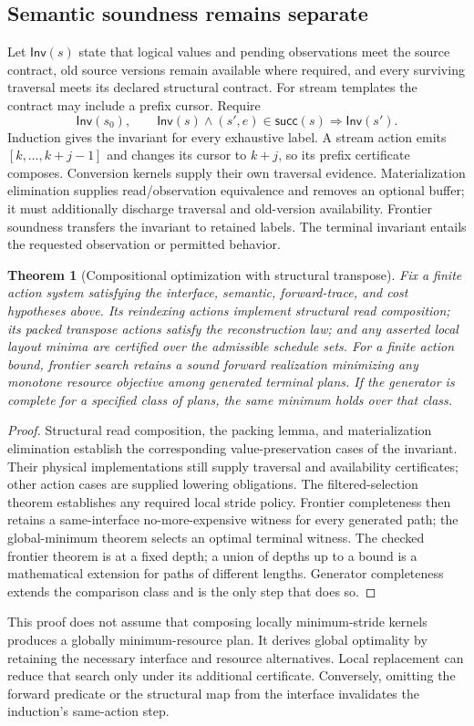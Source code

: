 \documentclass[11pt]{article}
\newtheorem{theorem}{Theorem}
\begin{document}
\subsection{Semantic soundness remains separate}
Let $\mathsf{Inv}(s)$ state that logical values and pending observations meet the source contract, old source versions remain available where required, and every surviving traversal meets its declared structural contract. For stream templates the contract may include a prefix cursor. Require
\[
 \mathsf{Inv}(s_0),\qquad
 \mathsf{Inv}(s)\land(s',e)\in\mathsf{succ}(s)
 \Longrightarrow\mathsf{Inv}(s').
\]
Induction gives the invariant for every exhaustive label. A stream action emits $[k,\ldots,k+j-1]$ and changes its cursor to $k+j$, so its prefix certificate composes. Conversion kernels supply their own traversal evidence. Materialization elimination supplies read/observation equivalence and removes an optional buffer; it must additionally discharge traversal and old-version availability. Frontier soundness transfers the invariant to retained labels. The terminal invariant entails the requested observation or permitted behavior.

\begin{theorem}[Compositional optimization with structural transpose]
Fix a finite action system satisfying the interface, semantic, forward-trace, and cost hypotheses above. Its reindexing actions implement structural read composition; its packed transpose actions satisfy the reconstruction law; and any asserted local layout minima are certified over the admissible schedule sets. For a finite action bound, frontier search retains a sound forward realization minimizing any monotone resource objective among generated terminal plans. If the generator is complete for a specified class of plans, the same minimum holds over that class.
\end{theorem}
\begin{proof}
Structural read composition, the packing lemma, and materialization elimination establish the corresponding value-preservation cases of the invariant. Their physical implementations still supply traversal and availability certificates; other action cases are supplied lowering obligations. The filtered-selection theorem establishes any required local stride policy. Frontier completeness then retains a same-interface no-more-expensive witness for every generated path; the global-minimum theorem selects an optimal terminal witness. The checked frontier theorem is at a fixed depth; a union of depths up to a bound is a mathematical extension for paths of different lengths. Generator completeness extends the comparison class and is the only step that does so.
\end{proof}
This proof does not assume that composing locally minimum-stride kernels produces a globally minimum-resource plan. It derives global optimality by retaining the necessary interface and resource alternatives. Local replacement can reduce that search only under its additional certificate. Conversely, omitting the forward predicate or the structural map from the interface invalidates the induction's same-action step.
\end{document}
